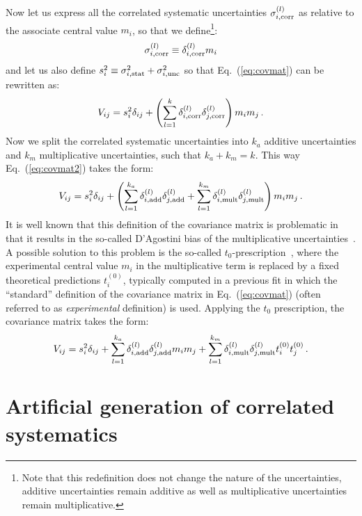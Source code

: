 \documentclass[10pt,a4paper]{article}
\begin{document}
Now let us express all the correlated systematic uncertainties
$\sigma_{i,\rm corr}^{(l)}$ as relative to the associate central value
$m_i$, so that we define\footnote{Note that this redefinition does not
  change the nature of the uncertainties, additive uncertainties
  remain additive as well as multiplicative uncertainties remain
  multiplicative.}:
\begin{equation}
\sigma_{i,\rm corr}^{(l)}\equiv  \delta_{i,\rm corr}^{(l)} m_i
\end{equation}
and let us also define
$s_i^2\equiv \sigma_{i,\rm stat}^2 +\sigma_{i,\rm unc}^2$ so that
Eq.~(\ref{eq:covmat}) can be rewritten as:
\begin{equation}\label{eq:covmat2}
  V_{ij}=s_i^2\delta_{ij} + \left(\sum_{l=1}^{k}\delta_{i,\rm
    corr}^{(l)}\delta_{j,\rm
    corr}^{(l)}\right)m_im_j\,.
\end{equation}
Now we split the correlated systematic uncertainties into $k_a$
additive uncertainties and $k_m$ multiplicative uncertainties, such
that $k_a+k_m=k$. This way Eq.~(\ref{eq:covmat2}) takes the form:
\begin{equation}\label{eq:covmat3}
  V_{ij}=s_i^2\delta_{ij} + \left(\sum_{l=1}^{k_a}\delta_{i,\rm
    add}^{(l)}\delta_{j,\rm
    add}^{(l)}+\sum_{l=1}^{k_m}\delta_{i,\rm
    mult}^{(l)}\delta_{j,\rm
    mult}^{(l)}\right)m_im_j\,.
\end{equation}
It is well known that this definition of the covariance matrix is
problematic in that it results in the so-called D'Agostini bias of the
multiplicative uncertainties~\cite{DAgostini:1993arp}. A possible
solution to this problem is the so-called
$t_0$-prescription~\cite{Ball:2009qv}, where the experimental central
value $m_i$ in the multiplicative term is replaced by a fixed
theoretical predictions $t_i^{(0)}$, typically computed in a previous
fit in which the ``standard'' definition of the covariance matrix in
Eq.~(\ref{eq:covmat}) (often referred to as \textit{experimental}
definition) is used. Applying the $t_0$ prescription, the covariance
matrix takes the form:
\begin{equation}\label{eq:covmat4}
  V_{ij}=s_i^2\delta_{ij} + \sum_{l=1}^{k_a}\delta_{i,\rm
    add}^{(l)}\delta_{j,\rm
    add}^{(l)}m_im_j+\sum_{l=1}^{k_m}\delta_{i,\rm
    mult}^{(l)}\delta_{j,\rm
    mult}^{(l)}t_i^{(0)}t_j^{(0)}\,.
\end{equation}

\section{Artificial generation of correlated systematics}
\end{document}
